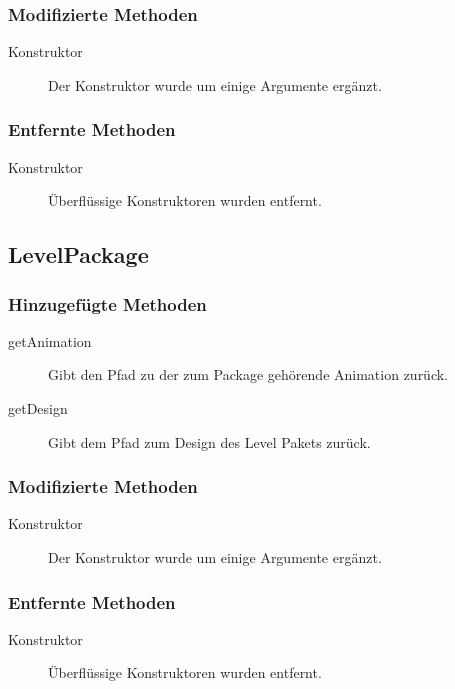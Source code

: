 	\subsubsection{Modifizierte Methoden}
		\begin{description}
			\item[Konstruktor] Der Konstruktor wurde um einige Argumente ergänzt.
		\end{description}
	\subsubsection{Entfernte Methoden}
		\begin{description}
			\item[Konstruktor] Überflüssige Konstruktoren wurden entfernt.
		\end{description}


\subsection{LevelPackage}

	\subsubsection{Hinzugefügte Methoden}
		\begin{description}
			\item[getAnimation] Gibt den Pfad zu der zum Package gehörende Animation zurück.
			\item[getDesign] Gibt dem Pfad zum Design des Level Pakets zurück.
		\end{description}
	\subsubsection{Modifizierte Methoden}
		\begin{description}
			\item[Konstruktor] Der Konstruktor wurde um einige Argumente ergänzt.
		\end{description}
	\subsubsection{Entfernte Methoden}
		\begin{description}
			\item[Konstruktor] Überflüssige Konstruktoren wurden entfernt.
		\end{description}




